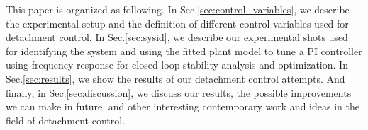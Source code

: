 This paper is organized as following. In Sec.\ref{sec:control_variables}, we describe the experimental setup and the definition of different control variables used for detachment control. In Sec.\ref{sec:sysid}, we describe our experimental shots used for identifying the system and using the fitted plant model to tune a PI controller using frequency response for closed-loop stability analysis and optimization. In Sec.\ref{sec:results}, we show the results of our detachment control attempts. And finally, in Sec.\ref{sec:discussion}, we discuss our results, the possible improvements we can make in future, and other interesting contemporary work and ideas in the field of detachment control.